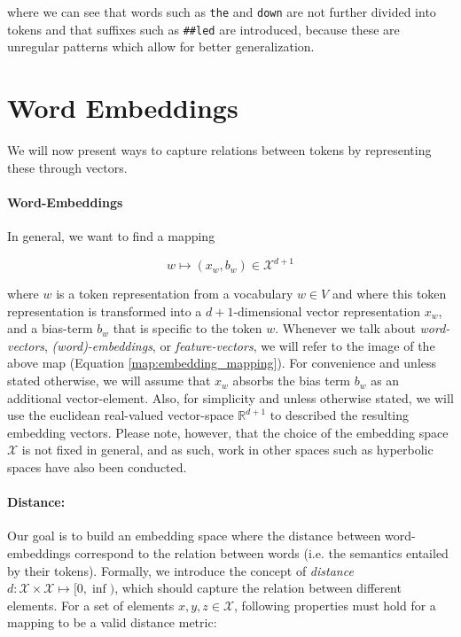 \documentclass[a4paper,12pt,oneside,openright]{report}
\begin{document}
where we can see that words such as \Verb#the# and \Verb#down# are not further divided into tokens and that suffixes such as \Verb!##led! are introduced, because these are unregular patterns which allow for better generalization.






\section{Word Embeddings}

We will now present ways to capture relations between tokens by representing these through vectors.

\paragraph{Word-Embeddings}
In general, we want to find a mapping 

\begin{equation}
\label{map:embedding_mapping}
w \mapsto (x_w, b_w) \in \mathcal{X}^{d + 1}
\end{equation}

where $w$ is a token representation from a vocabulary $w \in V$ and where this token representation is transformed into a $d+1$-dimensional vector representation $x_w$, and a bias-term $b_w$ that is specific to the token $w$.
Whenever we talk about \textit{word-vectors}, \textit{(word)-embeddings}, or \textit{feature-vectors}, we will refer to the image of the above map (Equation \ref{map:embedding_mapping}). 
For convenience and unless stated otherwise, we will assume that $x_w$ absorbs the bias term $b_w$ as an additional vector-element.
Also, for simplicity and unless otherwise stated, we will use the euclidean real-valued vector-space $\mathbb{R}^{d+1}$ to described the resulting embedding vectors.
Please note, however, that the choice of the embedding space $\mathcal{X}$ is not fixed in general, and as such, work in other spaces such as hyperbolic spaces  \cite{ganea18} have also been conducted. 

\paragraph{Distance:} Our goal is to build an embedding space where the distance between word-embeddings correspond to the relation between words (i.e. the semantics entailed by their tokens).
Formally, we introduce the concept of \textit{distance} $d : \mathcal{X}  \times \mathcal{X} \mapsto [ 0, \inf )$, which should capture the relation between different elements. 
For a set of elements $x, y, z \in \mathcal{X}$, following properties must hold for a mapping to be a valid distance metric:
\end{document}
